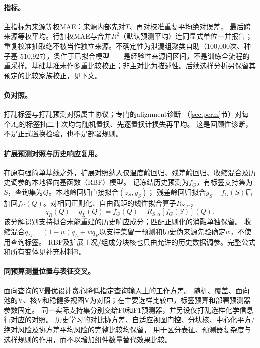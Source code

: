 \documentclass[11pt,a4paper]{article}
\begin{document}
\paragraph{指标。}主指标为来源等权MAE：来源内部先对$T$、再对校准重复平均绝对误差，
最后跨来源等权平均。行加权MAE与合并$R^2$（默认预测平均）连同显式单位一并报告；
重复校准抽取绝不被当作独立来源。不确定性为泄漏组聚类自助（100{,}000次、种子基
510{,}927），条件于已拟合模型——是经验性来源间区间，不是训练全流程的重采样。基础基准未作多重比较校正；非主对比为描述性。后续选样分析另保留其预定的比较家族校正，见下文。

\paragraph{负对照。}打乱标签与打乱预测对照属主协议；专门的alignment诊断
（\ref{sec:perm}节）对每个$A_k$的标签抽二十次均匀随机置换、先逐置换计损失再平均。
这是回顾性诊断，不是正式置换检验，也不是部署规则。


\paragraph{扩展预测对照与历史响应复用。}
在原有强简单基线之外，扩展对照纳入仅温度岭回归、残差岭回归、收缩混合及历史调参的本地径向基函数（RBF）模型。
记冻结历史预测为$f_G$，有标签支持集为$S$，查询集为$Q$。本地岭回归直接拟合$(z_S,y_S)$；
残差岭回归拟合$y_S-f_G(S)$后加回$f_G(Q)$。对相同正则化、自由截距的线性拟合算子$R_{S,\alpha}$，
\begin{equation}\label{eq:ext_projection}
q_R(Q)-q_L(Q)=f_G(Q)-R_{S,\alpha}[f_G(S)](Q).
\end{equation}
该分解识别支持拟合未能重建的历史响应成分；匹配正则化的消融单独保留。
收缩混合$q_M=(1-w)q_L+wq_R$以支持集留一预测和历史伪来源先验确定$w$，不使用查询标签。
RBF及扩展工况/组成分块核也只由允许的历史数据调参。完整公式和所有变体见补充材料B。

\paragraph{同预算测量位置与表征交叉。}
面向查询的V最优设计贪心降低指定查询输入上的工作方差\cite{yubi,gorodetsky2016}。
随机、覆盖、面向池的V、核V和稳健多视图V为对照；在主要选样比较中，标签预算和部署预测器参数固定。
同一实际支持集分别交给F0和F1预测器，并另设仅打乱选样化学信息行对应的对照。
历史学习的对比协方差、自适应视图门控、分块核、中心化平方/绝对风险及协方差平均风险的完整比较均保留，
用于区分表征、预测器复杂度与选样规则的作用，而不以增加组件数量替代效果比较。
\end{document}
